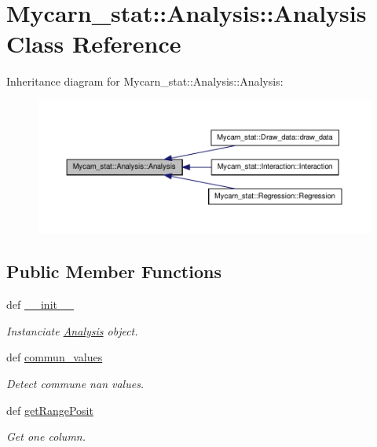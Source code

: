\hypertarget{classMycarn__stat_1_1Analysis_1_1Analysis}{
\section{\-Mycarn\-\_\-stat\-:\-:\-Analysis\-:\-:\-Analysis \-Class \-Reference}
\label{classMycarn__stat_1_1Analysis_1_1Analysis}
}


\-Inheritance diagram for \-Mycarn\-\_\-stat\-:\-:\-Analysis\-:\-:\-Analysis\-:
\nopagebreak
\begin{figure}[H]
\begin{center}
\leavevmode
\includegraphics[width=350pt]{classMycarn__stat_1_1Analysis_1_1Analysis__inherit__graph}
\end{center}
\end{figure}
\subsection*{\-Public \-Member \-Functions}
\begin{DoxyCompactItemize}
\item 
\hypertarget{classMycarn__stat_1_1Analysis_1_1Analysis_a38fe13579fba1ee627d29895563c1001}{
def \hyperlink{classMycarn__stat_1_1Analysis_1_1Analysis_a38fe13579fba1ee627d29895563c1001}{\-\_\-\-\_\-init\-\_\-\-\_\-}}
\label{classMycarn__stat_1_1Analysis_1_1Analysis_a38fe13579fba1ee627d29895563c1001}

\begin{DoxyCompactList}\small\item\em \-Instanciate \hyperlink{classMycarn__stat_1_1Analysis_1_1Analysis}{\-Analysis} object. \end{DoxyCompactList}\item 
\hypertarget{classMycarn__stat_1_1Analysis_1_1Analysis_a0d1ce398ef5fdc08d5b58b7569d50f52}{
def \hyperlink{classMycarn__stat_1_1Analysis_1_1Analysis_a0d1ce398ef5fdc08d5b58b7569d50f52}{commun\-\_\-values}}
\label{classMycarn__stat_1_1Analysis_1_1Analysis_a0d1ce398ef5fdc08d5b58b7569d50f52}

\begin{DoxyCompactList}\small\item\em \-Detect commune nan values. \end{DoxyCompactList}\item 
def \hyperlink{classMycarn__stat_1_1Analysis_1_1Analysis_ae57b9d91229d015911a74de50664393e}{get\-Range\-Posit}
\begin{DoxyCompactList}\small\item\em \-Get one column. \end{DoxyCompactList}\end{DoxyCompactItemize}


